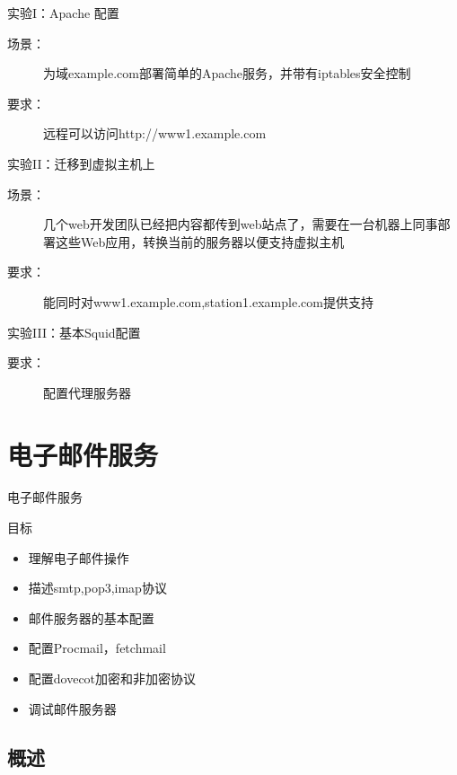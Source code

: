 \begin{frame}{实验I：Apache 配置}
\begin{description}
\item [{场景：}] 为域example.com部署简单的Apache服务，并带有iptables安全控制
\item [{要求：}] 远程可以访问http://www1.example.com
\end{description}

\end{frame} 
\begin{frame}{实验II：迁移到虚拟主机上}
\begin{description}
\item [{场景：}] 几个web开发团队已经把内容都传到web站点了，需要在一台机器上同事部署这些Web应用，转换当前的服务器以便支持虚拟主机
\item [{要求：}] 能同时对www1.example.com,station1.example.com提供支持
\end{description}

\end{frame} 
\begin{frame}{实验III：基本Squid配置}
\begin{description}
\item [{要求：}] 配置代理服务器
\end{description}



\end{frame} 
\section{电子邮件服务}


\begin{frame}{电子邮件服务}

目标
\begin{itemize}
\item 理解电子邮件操作
\item 描述smtp,pop3,imap协议
\item 邮件服务器的基本配置
\item 配置Procmail，fetchmail
\item 配置dovecot加密和非加密协议
\item 调试邮件服务器
\end{itemize}

\end{frame} 
\subsection{概述}



